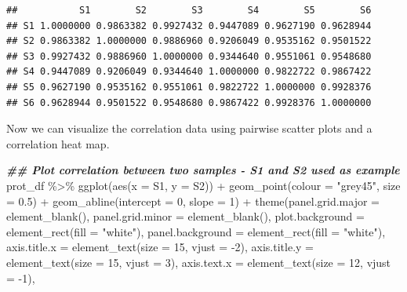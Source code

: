 \documentclass[9pt,a4paper,]{extarticle}
\newenvironment{Shaded}{\begin{snugshade}}{\end{snugshade}}
\newcommand{\AttributeTok}[1]{\textcolor[rgb]{0.77,0.63,0.00}{#1}}
\newcommand{\DecValTok}[1]{\textcolor[rgb]{0.00,0.00,0.81}{#1}}
\newcommand{\DocumentationTok}[1]{\textcolor[rgb]{0.56,0.35,0.01}{\textbf{\textit{#1}}}}
\newcommand{\FloatTok}[1]{\textcolor[rgb]{0.00,0.00,0.81}{#1}}
\newcommand{\FunctionTok}[1]{\textcolor[rgb]{0.00,0.00,0.00}{#1}}
\newcommand{\NormalTok}[1]{#1}
\newcommand{\SpecialCharTok}[1]{\textcolor[rgb]{0.00,0.00,0.00}{#1}}
\newcommand{\StringTok}[1]{\textcolor[rgb]{0.31,0.60,0.02}{#1}}
\begin{document}
\begin{verbatim}
##           S1        S2        S3        S4        S5        S6
## S1 1.0000000 0.9863382 0.9927432 0.9447089 0.9627190 0.9628944
## S2 0.9863382 1.0000000 0.9886960 0.9206049 0.9535162 0.9501522
## S3 0.9927432 0.9886960 1.0000000 0.9344640 0.9551061 0.9548680
## S4 0.9447089 0.9206049 0.9344640 1.0000000 0.9822722 0.9867422
## S5 0.9627190 0.9535162 0.9551061 0.9822722 1.0000000 0.9928376
## S6 0.9628944 0.9501522 0.9548680 0.9867422 0.9928376 1.0000000
\end{verbatim}

Now we can visualize the correlation data using pairwise scatter plots and a
correlation heat map.

\begin{Shaded}
\begin{Highlighting}[]
\DocumentationTok{\#\# Plot correlation between two samples {-} S1 and S2 used as example}
\NormalTok{prot\_df }\SpecialCharTok{\%\textgreater{}\%}
  \FunctionTok{ggplot}\NormalTok{(}\FunctionTok{aes}\NormalTok{(}\AttributeTok{x =} \StringTok{\textasciigrave{}}\AttributeTok{S1}\StringTok{\textasciigrave{}}\NormalTok{, }\AttributeTok{y =} \StringTok{\textasciigrave{}}\AttributeTok{S2}\StringTok{\textasciigrave{}}\NormalTok{)) }\SpecialCharTok{+}
  \FunctionTok{geom\_point}\NormalTok{(}\AttributeTok{colour =} \StringTok{"grey45"}\NormalTok{, }\AttributeTok{size =} \FloatTok{0.5}\NormalTok{) }\SpecialCharTok{+}
  \FunctionTok{geom\_abline}\NormalTok{(}\AttributeTok{intercept =} \DecValTok{0}\NormalTok{, }\AttributeTok{slope =} \DecValTok{1}\NormalTok{) }\SpecialCharTok{+}
  \FunctionTok{theme}\NormalTok{(}\AttributeTok{panel.grid.major =} \FunctionTok{element\_blank}\NormalTok{(), }
        \AttributeTok{panel.grid.minor =} \FunctionTok{element\_blank}\NormalTok{(),}
        \AttributeTok{plot.background =} \FunctionTok{element\_rect}\NormalTok{(}\AttributeTok{fill =} \StringTok{"white"}\NormalTok{),}
        \AttributeTok{panel.background =} \FunctionTok{element\_rect}\NormalTok{(}\AttributeTok{fill =} \StringTok{"white"}\NormalTok{),}
        \AttributeTok{axis.title.x =} \FunctionTok{element\_text}\NormalTok{(}\AttributeTok{size =} \DecValTok{15}\NormalTok{, }\AttributeTok{vjust =} \SpecialCharTok{{-}}\DecValTok{2}\NormalTok{),}
        \AttributeTok{axis.title.y =} \FunctionTok{element\_text}\NormalTok{(}\AttributeTok{size =} \DecValTok{15}\NormalTok{, }\AttributeTok{vjust =} \DecValTok{3}\NormalTok{),}
        \AttributeTok{axis.text.x =} \FunctionTok{element\_text}\NormalTok{(}\AttributeTok{size =} \DecValTok{12}\NormalTok{, }\AttributeTok{vjust =} \SpecialCharTok{{-}}\DecValTok{1}\NormalTok{),}

\end{Highlighting}
\end{Shaded}
\end{document}
